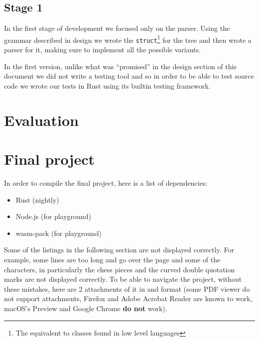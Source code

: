 \documentclass{article}
\begin{document}
\subsection{Stage 1}

In the first stage of development we focused only on the parser. Using the
grammar described in design we wrote the \texttt{struct}\footnote{The
equivalent to classes found in low level languages} for the tree and then wrote
a parser for it, making sure to implement all the possible variants.

In the first version, unlike what was ``promised'' in the design section of
this document we did not write a testing tool and so in order to be able to
test source code we wrote our tests in Rust using its builtin testing
framework.



\section{Evaluation}


\section{Final project}

In order to compile the final project, here is a list of dependencies:

\begin{itemize}
	\item Rust (nightly)
	\item Node.js (for playground)
	\item wasm-pack (for playground)
\end{itemize}

Some of the listings in the following section are not displayed correctly. For
example, some lines are too long and go over the page and some of the
characters, in particularly the chess pieces and the curved double quotation
marks are not displayed correctly. To be able to navigate the project, without
these mistakes, here are 2 attachments of it in
 and
 format (some PDF viewer do not
support attachments, Firefox and Adobe Acrobat Reader are known to work,
macOS's Preview and Google Chrome \textbf{do not} work).
\end{document}
